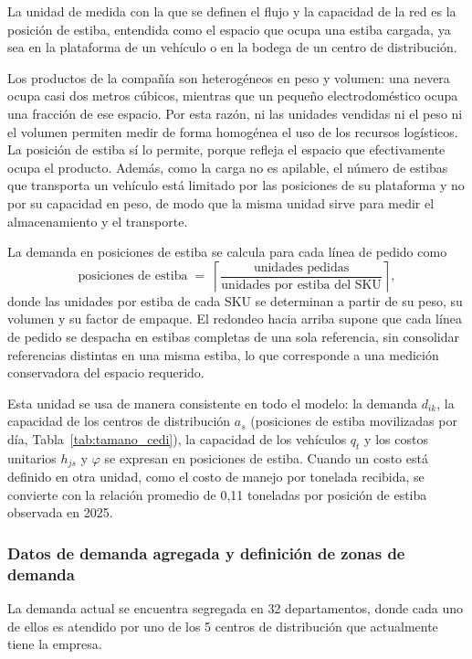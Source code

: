 \documentclass[fleqn, 11pt,letterpaper]{article}
\begin{document}
La unidad de medida con la que se definen el flujo y la capacidad de la red es la posición de estiba, entendida como el espacio que ocupa una estiba cargada, ya sea en la plataforma de un vehículo o en la bodega de un centro de distribución.

Los productos de la compañía son heterogéneos en peso y volumen: una nevera ocupa casi dos metros cúbicos, mientras que un pequeño electrodoméstico ocupa una fracción de ese espacio. Por esta razón, ni las unidades vendidas ni el peso ni el volumen permiten medir de forma homogénea el uso de los recursos logísticos. La posición de estiba sí lo permite, porque refleja el espacio que efectivamente ocupa el producto. Además, como la carga no es apilable, el número de estibas que transporta un vehículo está limitado por las posiciones de su plataforma y no por su capacidad en peso, de modo que la misma unidad sirve para medir el almacenamiento y el transporte.

La demanda en posiciones de estiba se calcula para cada línea de pedido como
\begin{equation*}
    \text{posiciones de estiba} \; = \; \left\lceil \frac{\text{unidades pedidas}}{\text{unidades por estiba del SKU}} \right\rceil ,
\end{equation*}
donde las unidades por estiba de cada SKU se determinan a partir de su peso, su volumen y su factor de empaque. El redondeo hacia arriba supone que cada línea de pedido se despacha en estibas completas de una sola referencia, sin consolidar referencias distintas en una misma estiba, lo que corresponde a una medición conservadora del espacio requerido.

Esta unidad se usa de manera consistente en todo el modelo: la demanda $d_{ik}$, la capacidad de los centros de distribución $a_s$ (posiciones de estiba movilizadas por día, Tabla~\ref{tab:tamano_cedi}), la capacidad de los vehículos $q_t$ y los costos unitarios $h_{js}$ y $\varphi$ se expresan en posiciones de estiba. Cuando un costo está definido en otra unidad, como el costo de manejo por tonelada recibida, se convierte con la relación promedio de 0,11 toneladas por posición de estiba observada en 2025.

\subsubsection{Datos de demanda agregada y definición de zonas de demanda}
La demanda actual se encuentra segregada en 32 departamentos, donde cada uno de ellos es atendido por uno de los 5 centros de distribución que actualmente tiene la empresa.
\end{document}
